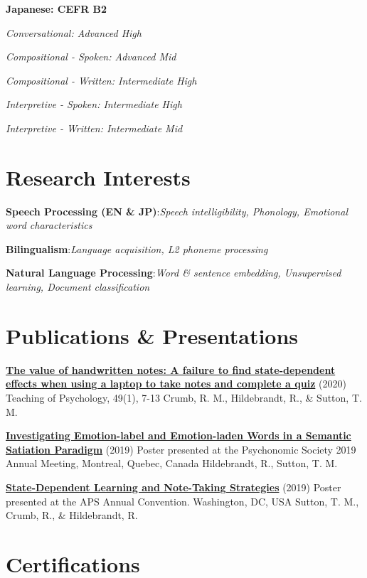 \documentclass[a4paper,9pt]{extarticle}
\begin{document}
\noindent
\textbf{Japanese: CEFR B2}

\textit{Conversational: Advanced High}

\textit{Compositional - Spoken: Advanced Mid}

\textit{Compositional - Written: Intermediate High}

\textit{Interpretive - Spoken: Intermediate High}

\textit{Interpretive - Written: Intermediate Mid}




\section*{Research Interests}

\noindent
\textbf{Speech Processing (EN \& JP)}:\textit{Speech intelligibility, Phonology, Emotional word characteristics}

\noindent
\textbf{Bilingualism}:\textit{Language acquisition, L2 phoneme processing}

\noindent
\textbf{Natural Language Processing}:\textit{Word \& sentence embedding, Unsupervised learning, Document classification}



\section*{Publications \& Presentations}

\noindent
\textbf{\href{http://dx.doi.org/10.1177/0098628320979895}{The value of handwritten notes: A failure to find state-dependent effects when using a laptop to take notes and complete a quiz}} (2020)
Teaching of Psychology, 49(1), 7-13
Crumb, R. M., Hildebrandt, R., \& Sutton, T. M.

\noindent
\textbf{\href{}{Investigating Emotion-label and Emotion-laden Words in a Semantic Satiation Paradigm}} (2019)
Poster presented at the Psychonomic Society 2019 Annual Meeting, Montreal, Quebec, Canada
Hildebrandt, R., Sutton, T. M.

\noindent
\textbf{\href{}{State-Dependent Learning and Note-Taking Strategies}} (2019)
Poster presented at the APS Annual Convention. Washington, DC, USA
Sutton, T. M., Crumb, R., \& Hildebrandt, R.



\section*{Certifications}
\end{document}

